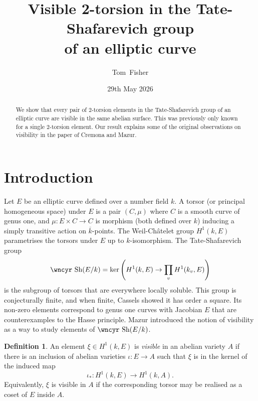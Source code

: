 \documentclass[12pt]{amsart}
\newcommand{\kbar}{{\overline k}}
\newcommand{\Sha}{\mbox{\wncyr Sh}}
\theoremstyle{definition}
\newtheorem{Definition}[Proposition]{Definition}
\begin{document}
\title[Visible 2-torsion in the Tate-Shafarevich group]%
{Visible 2-torsion in the Tate-Shafarevich group \\ of an elliptic curve}

\author{Tom~Fisher}
\address{University of Cambridge,
         DPMMS, Centre for Mathematical Sciences,
         Wilberforce Road, Cambridge CB3 0WB, UK}

\date{29th May 2026}  

\begin{abstract}
  We show that every pair of $2$-torsion elements in the
  Tate-Shafarevich group of an elliptic curve are visible in the same
  abelian surface. This was previously only known for a single
  $2$-torsion element.  Our result explains some of the original
  observations on visibility in the paper of Cremona and Mazur.
\end{abstract}

\maketitle

\renewcommand{\baselinestretch}{1.1}
\renewcommand{\arraystretch}{1.3}
\renewcommand{\theenumi}{\roman{enumi}}

\section{Introduction}

Let $E$ be an elliptic curve defined over a number field $k$.  A
torsor (or principal homogeneous space) under $E$ is a pair $(C,\mu)$
where $C$ is a smooth curve of genus one, and $\mu : E \times C \to C$
is morphism (both defined over $k$) inducing a simply transitive
action on $\kbar$-points.  The Weil-Ch\^atelet group $H^1(k,E)$
parametrises the torsors under $E$ up to $k$-isomorphism. The
Tate-Shafarevich group
\[ \Sha(E/k) = \ker \left( H^1(k,E) \to \prod_v H^1(k_v,E) \right) \]
is the subgroup of torsors that are everywhere locally soluble.  This
group is conjecturally finite, and when finite, Cassels \cite{CaIV}
showed it has order a square.  Its non-zero elements correspond to
genus one curves with Jacobian $E$ that are counterexamples to the
Hasse principle.  Mazur introduced the notion of visibility as a way
to study elements of $\Sha(E/k)$.

\begin{Definition}
  An element $\xi \in H^1(k,E)$ is {\em visible} in an abelian variety
  $A$ if there is an inclusion of abelian varieties $\iota : E \to A$
  such that $\xi$ is in the kernel of the induced map
  \[ \iota_* : H^1(k,E) \to H^1(k,A). \]
  Equivalently, $\xi$ is visible in $A$ if the corresponding torsor
  may be realised as a coset of $E$ inside $A$.
\end{Definition} 
\end{document}
